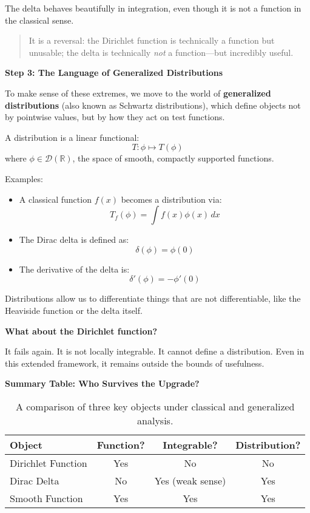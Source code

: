 The delta behaves beautifully in integration, even though it is not a function in the classical sense.

\begin{quote}
It is a reversal: the Dirichlet function is technically a function but unusable; the delta is technically \textit{not} a function---but incredibly useful.
\end{quote}

\vspace{1em}
\noindent
\textbf{Step 3: The Language of Generalized Distributions}

To make sense of these extremes, we move to the world of \textbf{generalized distributions} (also known as Schwartz distributions), which define objects not by pointwise values, but by how they act on test functions.

A distribution is a linear functional:
\[
T: \phi \mapsto T(\phi)
\]
where \( \phi \in \mathcal{D}(\mathbb{R}) \), the space of smooth, compactly supported functions.

Examples:
\begin{itemize}
    \item A classical function \( f(x) \) becomes a distribution via:
    \[
    T_f(\phi) = \int f(x)\phi(x)\, dx
    \]
    \item The Dirac delta is defined as:
    \[
    \delta(\phi) = \phi(0)
    \]
    \item The derivative of the delta is:
    \[
    \delta'(\phi) = -\phi'(0)
    \]
\end{itemize}

Distributions allow us to differentiate things that are not differentiable, like the Heaviside function or the delta itself.

\vspace{1em}
\noindent
\textbf{What about the Dirichlet function?}

It fails again. It is not locally integrable. It cannot define a distribution. Even in this extended framework, it remains outside the bounds of usefulness.

\vspace{1.5em}
\noindent
\textbf{Summary Table: Who Survives the Upgrade?}

\begin{table}[H]
\centering
\renewcommand{\arraystretch}{1.2}
\begin{tabular}{|l|c|c|c|}
\hline
\textbf{Object} & \textbf{Function?} & \textbf{Integrable?} & \textbf{Distribution?} \\
\hline
Dirichlet Function & Yes & No & No \\
Dirac Delta        & No  & Yes (weak sense) & Yes \\
Smooth Function    & Yes & Yes & Yes \\
\hline
\end{tabular}
\caption{A comparison of three key objects under classical and generalized analysis.}
\end{table}

